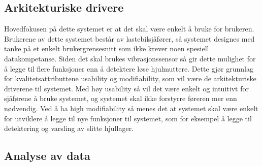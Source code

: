 \subsection{Arkitekturiske drivere}
Hovedfokusen på dette systemet er at det skal være enkelt å bruke for brukeren. 
Brukerene av dette systemet består av lastebilsjåfører, så systemet designes med tanke på et enkelt brukergrensesnitt som ikke krever noen spesiell datakompetanse. 
Siden det skal brukes vibrasjonssensor så gir dette mulighet for å legge til flere funksjoner enn å detektere løse hjulmuttere. 
Dette gjør grunnlag for kvalitetsattributtene usability og modifiability, som vil være de arkitekturiske driverene til systemet. 
Med høy usability så vil det være enkelt og intuitivt for sjåførene å bruke systemet, og systemet skal ikke forstyrre føreren mer enn nødvendig. 
Ved å ha high modifiability så menes det at systemet skal være enkelt for utviklere å legge til nye funksjoner til systemet, som for eksempel å legge til detektering og varsling av slitte hjullager.


\subsection{Analyse av data}

